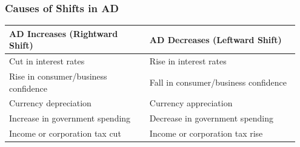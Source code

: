 \documentclass[11pt, a4paper, twoside]{book}
\begin{document}
\subsubsection{Causes of Shifts in AD}

\begin{tcolorbox}[enhanced,colback=LightBlue,colframe=MidBlue!70,arc=0pt,boxrule=0.8pt]
\begin{tabular}{@{}>{\RaggedRight\arraybackslash}p{0.46\linewidth}>{\RaggedRight\arraybackslash}p{0.49\linewidth}@{}}
\textbf{\color{NavyPrimary}AD Increases (Rightward Shift)} & \textbf{\color{NavyPrimary}AD Decreases (Leftward Shift)} \\
\midrule
Cut in interest rates & Rise in interest rates \\
Rise in consumer/business confidence & Fall in consumer/business confidence \\
Currency depreciation & Currency appreciation \\
Increase in government spending & Decrease in government spending \\
Income or corporation tax cut & Income or corporation tax rise \\
\end{tabular}
\end{tcolorbox}
\end{document}
